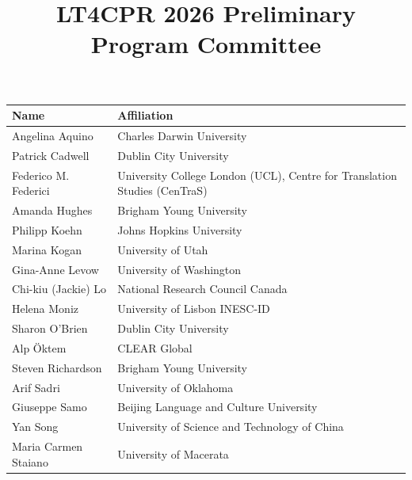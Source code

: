 \documentclass[11pt]{article}
\title{LT4CPR 2026 Preliminary Program Committee}
\author{}
\date{}
\begin{document}
\maketitle

\begin{tabularx}{\textwidth}{@{}>{\raggedright\arraybackslash}p{}X@{}}
  \toprule
  \textbf{Name} & \textbf{Affiliation} \\
  \midrule
  Angelina Aquino & Charles Darwin University \\
  Patrick Cadwell & Dublin City University \\
  Federico M. Federici & University College London (UCL), Centre for Translation Studies (CenTraS) \\
  Amanda Hughes & Brigham Young University \\
  Philipp Koehn & Johns Hopkins University \\
  Marina Kogan & University of Utah \\
  Gina-Anne Levow & University of Washington \\
  Chi-kiu (Jackie) Lo & National Research Council Canada \\
  Helena Moniz & University of Lisbon \textperiodcentered{} INESC-ID \\
  Sharon O'Brien & Dublin City University \\
  Alp \"{O}ktem & CLEAR Global \\
  Steven Richardson & Brigham Young University \\
  Arif Sadri & University of Oklahoma \\
  Giuseppe Samo & Beijing Language and Culture University \\
  Yan Song & University of Science and Technology of China \\
  Maria Carmen Staiano & University of Macerata \\
  \bottomrule
\end{tabularx}
\end{document}
